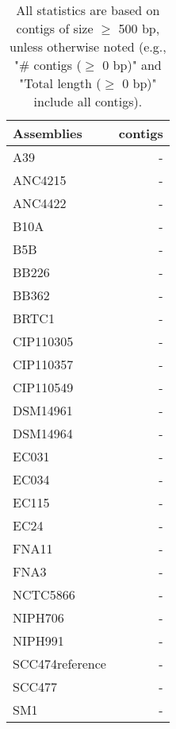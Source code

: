 \documentclass[12pt,a4paper]{article}
\begin{document}
\begin{table}[ht]
\begin{center}
\caption{All statistics are based on contigs of size $\geq$ 500 bp, unless otherwise noted (e.g., "\# contigs ($\geq$ 0 bp)" and "Total length ($\geq$ 0 bp)" include all contigs).}
\begin{tabular}{|l*{1}{|r}|}
\hline
Assemblies & contigs \\ \hline
A39 & - \\ \hline
ANC4215 & - \\ \hline
ANC4422 & - \\ \hline
B10A & - \\ \hline
B5B & - \\ \hline
BB226 & - \\ \hline
BB362 & - \\ \hline
BRTC1 & - \\ \hline
CIP110305 & - \\ \hline
CIP110357 & - \\ \hline
CIP110549 & - \\ \hline
DSM14961 & - \\ \hline
DSM14964 & - \\ \hline
EC031 & - \\ \hline
EC034 & - \\ \hline
EC115 & - \\ \hline
EC24 & - \\ \hline
FNA11 & - \\ \hline
FNA3 & - \\ \hline
NCTC5866 & - \\ \hline
NIPH706 & - \\ \hline
NIPH991 & - \\ \hline
SCC474reference & - \\ \hline
SCC477 & - \\ \hline
SM1 & - \\ \hline
\end{tabular}
\end{center}
\end{table}
\end{document}

